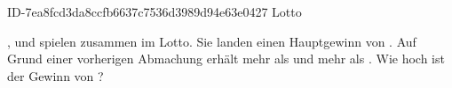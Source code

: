 \begin{exercise}
      {ID-7ea8fcd3da8ccfb6637c7536d3989d94e63e0427}
      {Lotto}
  \ifproblem\problem\par
    \xxa, \xxb{} und \xxc{} spielen zusammen im Lotto. Sie landen einen Hauptgewinn
    von . Auf Grund einer vorherigen Abmachung erhält \xxb{}
     mehr als \xxa{} und \xxc{}  mehr als \xxb.
    Wie hoch ist der Gewinn von \xxa?
  \fi
\end{exercise}

